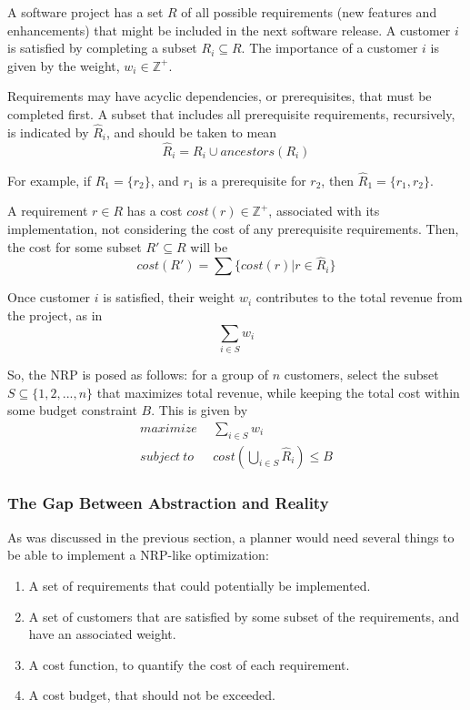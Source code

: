 \documentclass[a4paper]{scrartcl}
\begin{document}
A software project has a set $R$ of all possible requirements (new features and enhancements) that might be included in the next software release. A customer $i$ is satisfied by completing a subset $R_i \subseteq R$. The importance of a customer $i$ is given by the weight, $w_i \in \mathbb{Z}^+$.

Requirements may have acyclic dependencies, or prerequisites, that must be completed first. A subset that includes all prerequisite requirements, recursively, is indicated by $\hat{R}_i$, and should be taken to mean
\begin{equation}
\hat{R}_i = R_i \cup ancestors(R_i)
\end{equation}

For example, if $R_1 = \{r_2\}$, and $r_1$ is a prerequisite for $r_2$, then $\hat{R}_1 = \{r_1,r_2\}$.

A requirement $r \in R$ has a cost $cost(r) \in \mathbb{Z}^+$, associated with its implementation, not considering the cost of any prerequisite requirements. Then, the cost for some subset $R' \subseteq R$ will be
\begin{equation}
cost(R') = \sum \{cost(r) | r \in \hat{R}_i \}
\end{equation}

Once customer $i$ is satisfied, their weight $w_i$ contributes to the total revenue from the project, as in
\begin{equation}
\sum_{i \in S} w_i
\end{equation}

So, the NRP is posed as follows: for a group of $n$ customers, select the subset $S \subseteq \{ 1,2,...,n \}$ that maximizes total revenue, while keeping the total cost within some budget constraint $B$. This is given by 
\begin{equation}
\begin{split}
maximize~~& \sum_{i \in S} w_i \\
subject~to~~~& cost(\bigcup_{i \in S} \hat{R}_i) \le B
\end{split}
\end{equation}

\subsubsection*{The Gap Between Abstraction and Reality}
As was discussed in the previous section, a planner would need several things to be able to implement a NRP-like optimization:
\begin{enumerate}
\item{A set of requirements that could potentially be implemented.}
\item{A set of customers that are satisfied by some subset of the requirements, and have an associated weight.}
\item{A cost function, to quantify the cost of each requirement.}
\item{A cost budget, that should not be exceeded.}
\end{enumerate}
\end{document}
